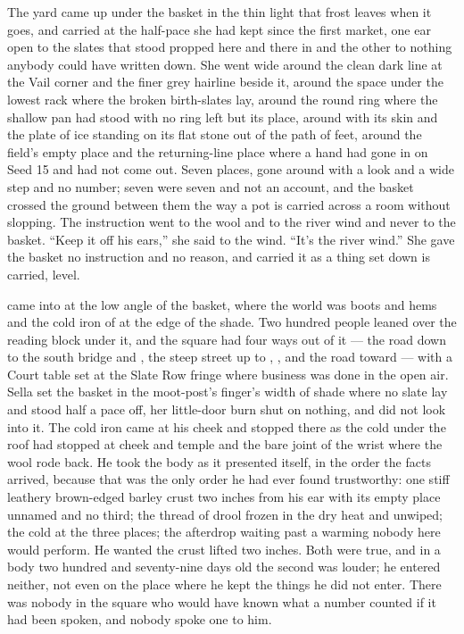 The yard came up under the basket in the thin light that frost leaves when it goes, and  carried at the half-pace she had kept since the first market, one ear open to the slates that stood propped here and there in  and the other to nothing anybody could have written down. She went wide around the clean dark line at the Vail corner and the finer grey hairline beside it, around the space under the lowest rack where the broken birth-slates lay, around the round ring where the shallow pan had stood with no ring left but its place, around  with its skin and the plate of ice standing on its flat stone out of the path of feet, around the field's empty place and the returning-line place where a hand had gone in on Seed 15 and had not come out. Seven places, gone around with a look and a wide step and no number; seven were seven and not an account, and the basket crossed the ground between them the way a pot is carried across a room without slopping. The instruction went to the wool and to the river wind and never to the basket. “Keep it off his ears,” she said to the wind. “It's the river wind.” She gave the basket no instruction and no reason, and carried it as a thing set down is carried, level.

 came into  at the low angle of the basket, where the world was boots and hems and the cold iron of  at the edge of the shade. Two hundred people leaned over the reading block under it, and the square had four ways out of it --- the road down to the south bridge and , the steep street up to , , and the road toward  --- with a Court table set at the Slate Row fringe where business was done in the open air. Sella set the basket in the moot-post's finger's width of shade where no slate lay and stood half a pace off, her little-door burn shut on nothing, and did not look into it. The cold iron came at his cheek and stopped there as the cold under the roof had stopped at cheek and temple and the bare joint of the wrist where the wool rode back. He took the body as it presented itself, in the order the facts arrived, because that was the only order he had ever found trustworthy: one stiff leathery brown-edged barley crust two inches from his ear with its empty place unnamed and no third; the thread of drool frozen in the dry heat and unwiped; the cold at the three places; the afterdrop waiting past a warming nobody here would perform. He wanted the crust lifted two inches. Both were true, and in a body two hundred and seventy-nine days old the second was louder; he entered neither, not even on the place where he kept the things he did not enter. There was nobody in the square who would have known what a number counted if it had been spoken, and nobody spoke one to him.

